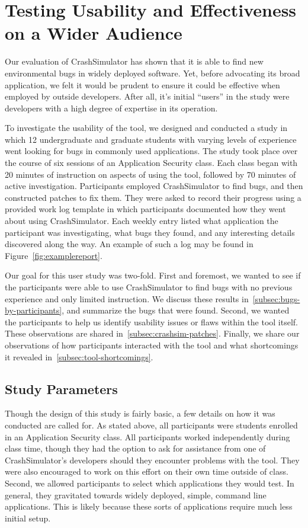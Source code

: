 \chapter{Testing Usability and Effectiveness on a Wider Audience}
\label{chap:userstudy}

Our evaluation of CrashSimulator has shown that it is able to find new environmental bugs in widely deployed software. Yet, before advocating its broad application, we felt it would be prudent to ensure it
could be effective when employed by outside developers.
After all, it's initial ``users'' in the study were developers with a high degree of expertise in its operation.

To investigate the usability of the tool,
we designed and conducted a study in which 12 undergraduate and graduate students with varying levels of experience went looking for bugs in commonly used applications.
The study took place over the course of six sessions
of an Application Security class.
Each class began with 20
minutes of instruction on aspects of using the tool, followed by 70 minutes of active investigation. Participants employed
CrashSimulator to find bugs, and then constructed patches to fix
them.
They were asked to record their progress
using a provided work log template in which participants documented
how they went about using CrashSimulator. 
Each weekly entry listed what application the participant was
investigating,  what bugs they found, and any interesting details discovered along the way. An example of such a log may be found in Figure~\ref{fig:examplereport}.

Our goal for this user study was two-fold.  First and foremost,
we wanted to see if the participants were able to use CrashSimulator to find bugs with no previous experience and only limited instruction.
We discuss these results in~\ref{subsec:bugs-by-participants}, and summarize the bugs that were found.
Second, we wanted the participants to help us identify usability issues
or flaws within the tool itself. These observations are shared in~\ref{subsec:crashsim-patches}. Finally, we share our observations
of how participants interacted with the tool and what shortcomings
it revealed in~\ref{subsec:tool-shortcomings}.

\section{Study Parameters}
\label{sec:studyparameters}

Though the design of this study is fairly basic, a few details on how it was conducted are called for. As stated above, all participants were students enrolled in an Application Security class.
All participants worked independently during class time, though they had the option to ask for assistance from one of CrashSimulator's developers should they encounter problems with the tool.
They were also encouraged to work on this effort on their own time outside of class.
Second, we allowed participants to select which applications they would test.
In general, they gravitated towards widely deployed, simple, command line applications.
This is likely because these sorts of applications require much less initial setup.

